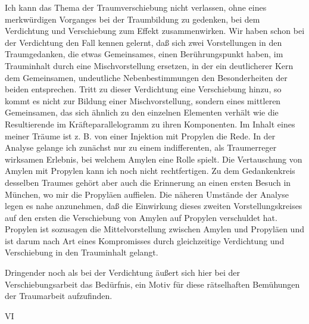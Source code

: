 \documentclass{article}
\begin{document}
            
        \pstart
        Ich kann das Thema der Traumverschiebung nicht verlassen, ohne eines
               merkwürdigen Vorganges bei der Traumbildung zu gedenken, bei dem Verdichtung und
               Verschiebung zum Effekt zusammenwirken. Wir haben schon bei der Verdichtung
               den Fall kennen gelernt, daß sich zwei Vorstellungen in den Traumgedanken, die etwas Gemeinsames, einen Berührungspunkt haben, im Trauminhalt
               durch eine Mischvorstellung ersetzen, in der ein deutlicherer Kern dem
               Gemeinsamen, undeutliche Nebenbestimmungen den Besonderheiten der
               beiden entsprechen. Tritt zu dieser Verdichtung eine Verschiebung hinzu, so
               kommt es nicht zur Bildung einer Mischvorstellung, sondern eines mittleren Gemeinsamen, das sich ähnlich zu den
               einzelnen Elementen verhält wie die Resultierende im Kräfteparallelogramm zu
               ihren Komponenten. Im Inhalt eines meiner Träume ist z. B. von einer
               Injektion mit Propylen die Rede. In der Analyse
               gelange ich zunächst nur zu einem indifferenten, als Traumerreger wirksamen Erlebnis, bei welchem Amylen
               eine Rolle spielt. Die Vertauschung von Amylen mit Propylen kann ich noch
               nicht rechtfertigen. Zu dem Gedankenkreis desselben Traumes gehört aber
               auch die Erinnerung an einen ersten Besuch in München, wo mir die Propyläen auffielen. Die näheren Umstände der
               Analyse legen es nahe anzunehmen, daß die Einwirkung dieses zweiten
               Vorstellungskreises auf den ersten die Verschiebung von Amylen auf Propylen
               verschuldet hat. Propylen ist sozusagen die
               Mittelvorstellung zwischen Amylen und Propyläen und ist darum nach Art eines Kompromisses durch gleichzeitige Verdichtung und
               Verschiebung in den Trauminhalt gelangt.
        \pend
    
         
            
            
            
        \pstart
        Dringender noch als bei der Verdichtung äußert sich hier bei der
               Verschiebungsarbeit das Bedürfnis, ein Motiv für diese rätselhaften
               Bemühungen der Traumarbeit aufzufinden.
        \pend
    
         
            
            
            
        \pstart
        VI
        \pend
    
\end{document}
